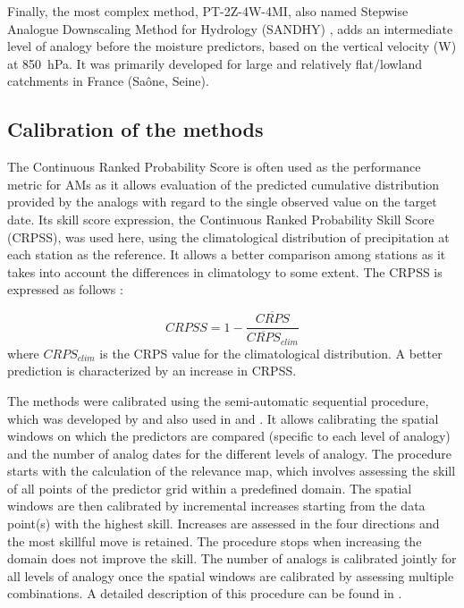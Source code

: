 \documentclass[alpha-refs]{wiley-article}
\begin{document}
Finally, the most complex method, PT-2Z-4W-4MI, also named Stepwise Analogue Downscaling Method for Hydrology (SANDHY) \citep{BenDaoud2016, Caillouet2016}, adds an intermediate level of analogy before the moisture predictors, based on the vertical velocity (W) at 850~hPa. It was primarily developed for large and relatively flat/lowland catchments in France (Sa\^{o}ne, Seine).



\subsection{Calibration of the methods} %
\label{sec:calibration}

The Continuous Ranked Probability Score \citep[CRPS,][]{Brown1974, Matheson1976, Hersbach2000} is often used as the performance metric for AMs as it allows evaluation of the predicted cumulative distribution provided by the analogs with regard to the single observed value on the target date. Its skill score expression, the Continuous Ranked Probability Skill Score (CRPSS), was used here, using the climatological distribution of precipitation at each station as the reference. It allows a better comparison among stations as it takes into account the differences in climatology to some extent. The CRPSS is expressed as follows \citep{Bradley2011}:

\begin{equation}
	\label{eq:CRPSS}
	CRPSS = 1-\frac{\overline{CRPS}}{\overline{CRPS}_{clim}}
\end{equation}
where $CRPS_{clim}$ is the CRPS value for the climatological distribution. A better prediction is characterized by an increase in CRPSS.

The methods were calibrated using the semi-automatic sequential procedure, which was developed by \citet{Bontron2004} and also used in \citet{Radanovics2013} and \citet{BenDaoud2016}. It allows calibrating the spatial windows on which the predictors are compared (specific to each level of analogy) and the number of analog dates for the different levels of analogy. The procedure starts with the calculation of the relevance map, which involves assessing the skill of all points of the predictor grid within a predefined domain. The spatial windows are then calibrated by incremental increases starting from the data point(s) with the highest skill. Increases are assessed in the four directions and the most skillful move is retained. The procedure stops when increasing the domain does not improve the skill. The number of analogs is calibrated jointly for all levels of analogy once the spatial windows are calibrated by assessing multiple combinations. A detailed description of this procedure can be found in \citet{Horton2019}. 
\end{document}
